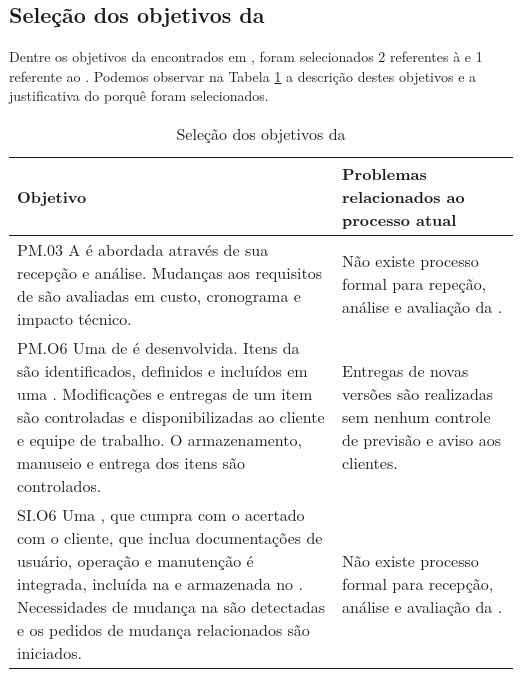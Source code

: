 \subsection{Seleção dos objetivos da \iso}
\label{Sec:estr:obj:iso}

Dentre os objetivos da \iso encontrados em \cite{iso}, foram selecionados 2 referentes à \gp e 1 referente ao \dsw. Podemos observar na Tabela \ref{Tab:estrat:obj:iso} a descrição destes objetivos e a justificativa do porquê foram selecionados.

\begin{table}[h!]\footnotesize
\centering
\begin{tabular}
{
 	|p{7cm}
 	|p{7cm}|
}

\hline

	\textbf{Objetivo \iso}&
	\textbf{Problemas relacionados ao processo atual}\\
	\hline
	
	PM.03 A \muda é abordada através de sua recepção e análise. Mudanças aos requisitos de \sw são avaliadas em custo, cronograma e impacto técnico.&
	Não existe processo formal para repeção, análise e avaliação da \muda.\\
	\hline
	
	
	PM.O6 Uma \vcs de \sw é desenvolvida. Itens da \swcfg são identificados, definidos e incluídos em uma \bline. Modificações e entregas de um item são controladas e disponibilizadas ao cliente e equipe de trabalho. O armazenamento, manuseio e entrega dos itens são controlados.&
	Entregas de novas versões são realizadas sem nenhum controle de previsão e aviso aos clientes.\\
	\hline
	
	SI.O6 Uma \swcfg, que cumpra com o \req acertado com o cliente, que inclua documentações de usuário, operação e manutenção é integrada, incluída na \bline e armazenada no \rep. Necessidades de mudança na \swcfg são detectadas e os pedidos de mudança relacionados são iniciados.&
	Não existe processo formal para recepção, análise e avaliação da \muda.\\
	\hline

\end{tabular}
\caption{Seleção dos objetivos da \iso}
\label{Tab:estrat:obj:iso}
\end{table}


